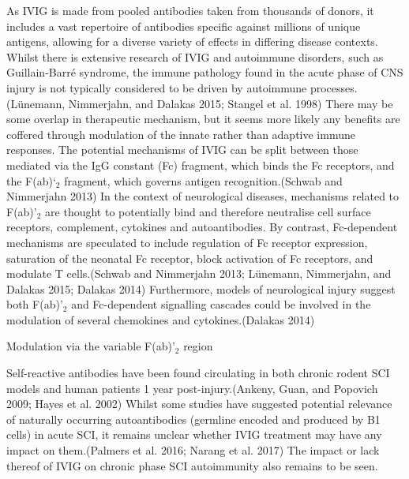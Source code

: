 \documentclass[9pt,lineno]{elife}
\begin{document}
\begin{landscape}
\begin{landscape}
As IVIG is made from pooled antibodies taken from thousands of donors, it includes a vast repertoire of antibodies specific against millions of unique antigens, allowing for a diverse variety of effects in differing disease contexts.
Whilst there is extensive research of IVIG and autoimmune disorders, such as Guillain-Barré syndrome, the immune pathology found in the acute phase of CNS injury is not typically considered to be driven by autoimmune processes.(Lünemann, Nimmerjahn, and Dalakas 2015; Stangel et al. 1998) There may be some overlap in therapeutic mechanism, but it seems more likely any benefits are coffered through modulation of the innate rather than adaptive immune responses. The potential mechanisms of IVIG can be split between those mediated via the IgG constant (Fc) fragment, which binds the Fc receptors, and the F(ab)`\(_2\) fragment, which governs antigen recognition.(Schwab and Nimmerjahn 2013) In the context of neurological diseases, mechanisms related to F(ab)'\(_2\) are thought to potentially bind and therefore neutralise cell surface receptors, complement, cytokines and autoantibodies. By contrast, Fc-dependent mechanisms are speculated to include regulation of Fc receptor expression, saturation of the neonatal Fc receptor, block activation of Fc receptors, and modulate T cells.(Schwab and Nimmerjahn 2013; Lünemann, Nimmerjahn, and Dalakas 2015; Dalakas 2014) Furthermore, models of neurological injury suggest both F(ab)'\(_2\) and Fc-dependent signalling cascades could be involved in the modulation of several chemokines and cytokines.(Dalakas 2014)

Modulation via the variable F(ab)'\(_2\) region

Self-reactive antibodies have been found circulating in both chronic rodent SCI models and human patients 1 year post-injury.(Ankeny, Guan, and Popovich 2009; Hayes et al. 2002) Whilst some studies have suggested potential relevance of naturally occurring autoantibodies (germline encoded and produced by B1 cells) in acute SCI, it remains unclear whether IVIG treatment may have any impact on them.(Palmers et al. 2016; Narang et al. 2017) The impact or lack thereof of IVIG on chronic phase SCI autoimmunity also remains to be seen.


\end{landscape}
\end{landscape}
\end{document}
